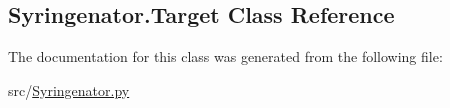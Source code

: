 \hypertarget{classSyringenator_1_1Target}{}\subsection{Syringenator.\+Target Class Reference}
\label{classSyringenator_1_1Target}


The documentation for this class was generated from the following file\+:\begin{DoxyCompactItemize}
\item 
src/\mbox{\hyperlink{Syringenator_8py}{Syringenator.\+py}}\end{DoxyCompactItemize}
